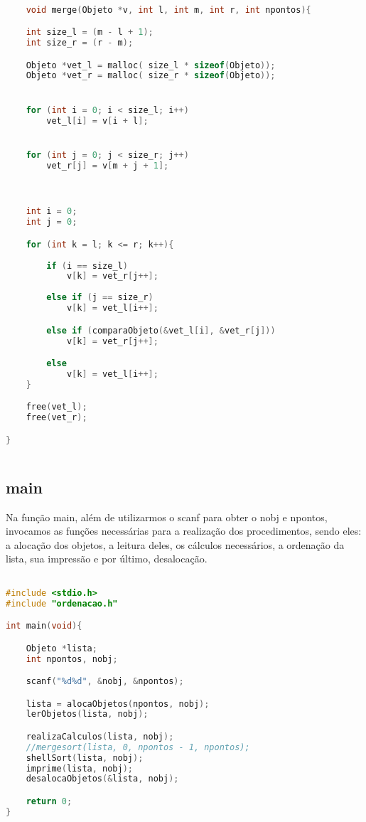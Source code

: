 \documentclass{article}
\begin{document}
\begin{lstlisting}[caption={Função merge},label={lst:cod7},language=C]

    void merge(Objeto *v, int l, int m, int r, int npontos){

    int size_l = (m - l + 1);
    int size_r = (r - m);

    Objeto *vet_l = malloc( size_l * sizeof(Objeto));
    Objeto *vet_r = malloc( size_r * sizeof(Objeto));


    for (int i = 0; i < size_l; i++)
        vet_l[i] = v[i + l];


    for (int j = 0; j < size_r; j++)
        vet_r[j] = v[m + j + 1];



    int i = 0; 
    int j = 0;

    for (int k = l; k <= r; k++){
         
        if (i == size_l)
            v[k] = vet_r[j++];
        
        else if (j == size_r)
            v[k] = vet_l[i++];

        else if (comparaObjeto(&vet_l[i], &vet_r[j]))
            v[k] = vet_r[j++];

        else
            v[k] = vet_l[i++];
    }

    free(vet_l);
    free(vet_r);

}
    
\end{lstlisting}
    

\clearpage
\subsection{main}

Na função main, além de utilizarmos o scanf para obter o nobj e npontos, invocamos as funções necessárias para a realização dos procedimentos, sendo eles: a alocação dos objetos, a leitura deles, os cálculos necessários, a ordenação da lista, sua impressão e por último, desalocação.

\begin{lstlisting}[caption={função main},label={lst:cod11},language=C]

#include <stdio.h>
#include "ordenacao.h"

int main(void){

    Objeto *lista;
    int npontos, nobj;

    scanf("%d%d", &nobj, &npontos);

    lista = alocaObjetos(npontos, nobj);
    lerObjetos(lista, nobj);

    realizaCalculos(lista, nobj);
    //mergesort(lista, 0, npontos - 1, npontos);
    shellSort(lista, nobj);
    imprime(lista, nobj);
    desalocaObjetos(&lista, nobj);

    return 0;
}

\end{lstlisting}
\end{document}
